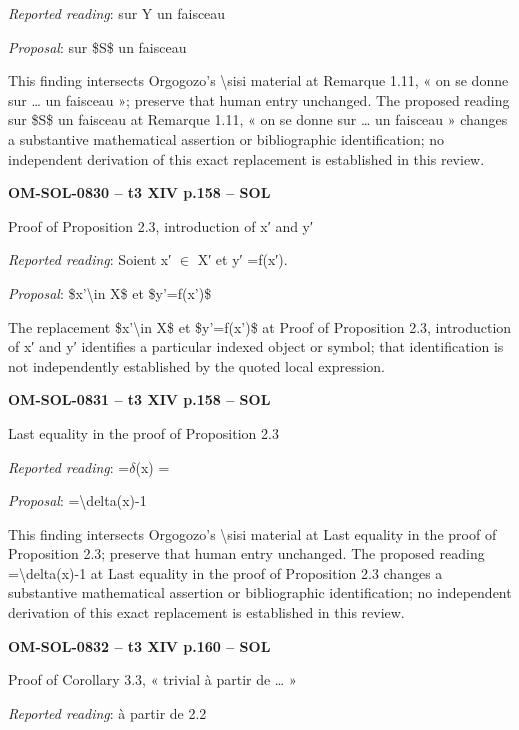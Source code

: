 \emph{Reported reading}: sur Y un faisceau\par
\emph{Proposal}: sur \$S\$ un faisceau\par
This finding intersects Orgogozo's \textbackslash{}sisi material at Remarque 1.11, « on se donne sur … un faisceau »; preserve that human entry unchanged. The proposed reading sur \$S\$ un faisceau at Remarque 1.11, « on se donne sur … un faisceau » changes a substantive mathematical assertion or bibliographic identification; no independent derivation of this exact replacement is established in this review.\par
\par\noindent\textbf{OM-SOL-0830 -- t3 XIV p.158 -- SOL}\par
Proof of Proposition 2.3, introduction of x′ and y′\par
\emph{Reported reading}: Soient x′ \ensuremath{\in} X′ et y′ =\allowbreak  f(x′).\par
\emph{Proposal}: \$x'\textbackslash{}in X\$ et \$y'=\allowbreak f(x')\$\par
The replacement \$x'\textbackslash{}in X\$ et \$y'=\allowbreak f(x')\$ at Proof of Proposition 2.3, introduction of x′ and y′ identifies a particular indexed object or symbol; that identification is not independently established by the quoted local expression.\par
\par\noindent\textbf{OM-SOL-0831 -- t3 XIV p.158 -- SOL}\par
Last equality in the proof of Proposition 2.3\par
\emph{Reported reading}: =\allowbreak  \ensuremath{\delta}(x) =\par
\emph{Proposal}: =\allowbreak \textbackslash{}delta(x)-1\par
This finding intersects Orgogozo's \textbackslash{}sisi material at Last equality in the proof of Proposition 2.3; preserve that human entry unchanged. The proposed reading =\allowbreak \textbackslash{}delta(x)-1 at Last equality in the proof of Proposition 2.3 changes a substantive mathematical assertion or bibliographic identification; no independent derivation of this exact replacement is established in this review.\par
\par\noindent\textbf{OM-SOL-0832 -- t3 XIV p.160 -- SOL}\par
Proof of Corollary 3.3, « trivial à partir de … »\par
\emph{Reported reading}: à partir de 2.2\par
